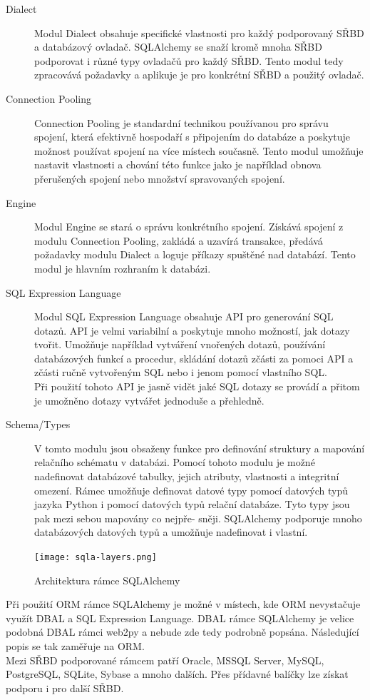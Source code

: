 \documentclass[ing,male,java,dept456]{diploma}						%
\begin{document}
\begin{description}
\item[Dialect] Modul Dialect obsahuje specifické vlastnosti pro každý podporovaný SŘBD a databázový ovladač. SQLAlchemy se snaží kromě mnoha SŘBD podporovat i různé typy ovladačů pro každý SŘBD. Tento modul tedy zpracovává požadavky a aplikuje je pro konkrétní SŘBD a použitý ovladač.
\item[Connection Pooling] Connection Pooling je standardní technikou používanou pro správu spojení, která efektivně hospodaří s připojením do databáze a poskytuje možnost používat spojení na více místech současně. Tento modul umožňuje nastavit vlastnosti a chování této funkce jako je například obnova přerušených spojení nebo množství spravovaných spojení.
\item[Engine] Modul Engine se stará o správu konkrétního spojení. Získává spojení z modulu Connection Pooling, zakládá a uzavírá transakce, předává požadavky modulu Dialect a loguje příkazy spuštěné nad databází. Tento modul je hlavním rozhraním k databázi.
\item[SQL Expression Language] Modul SQL Expression Language obsahuje API pro generování SQL dotazů. API je velmi variabilní a poskytuje mnoho možností, jak dotazy tvořit. Umožňuje například vytváření vnořených dotazů, používání databázových funkcí a procedur, skládání dotazů zčásti za pomoci API a zčásti ručně vytvořeným SQL nebo i jenom pomocí vlastního SQL. \\
Při použití tohoto API je jasně vidět jaké SQL dotazy se provádí a přitom je umožněno dotazy vytvářet jednoduše a přehledně.
\item[Schema/Types] V tomto modulu jsou obsaženy funkce pro definování struktury a mapování relačního schématu v databázi. Pomocí tohoto modulu je možné nadefinovat databázové tabulky, jejich atributy, vlastnosti a integritní omezení. Rámec umožňuje definovat datové typy pomocí datových typů jazyka Python i pomocí datových typů relační databáze. Tyto typy jsou pak mezi sebou mapovány co nejpře- sněji. SQLAlchemy podporuje mnoho databázových datových typů a umožňuje nadefinovat i vlastní.
\end{description}

\begin{figure}[h!]
    \centering
    \texttt{[image: sqla-layers.png]}
    \caption{Architektura rámce SQLAlchemy \cite[str. 3]{sqla-doc}}
    \label{fig:sqla-layers}
\end{figure}

Při použití ORM rámce SQLAlchemy je možné v místech, kde ORM nevystačuje využít DBAL a SQL Expression Language. DBAL rámce SQLAlchemy je velice podobná DBAL rámci web2py a nebude zde tedy podrobně popsána. Následující popis se tak zaměřuje na ORM. \\
Mezi SŘBD podporované rámcem patří Oracle, MSSQL Server, MySQL, PostgreSQL, SQLite, Sybase a mnoho dalších. Přes přídavné balíčky lze získat podporu i pro další SŘBD.
\end{document}
